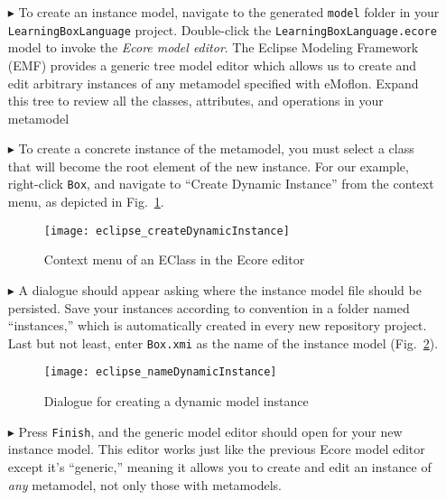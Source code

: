 \begin{itemize}

\item[$\blacktriangleright$] To create an instance model, navigate to the generated \texttt{model} folder in your \texttt{LearningBoxLanguage} project.
Double-click the \texttt{LearningBoxLa\-nguage.ecore} model to invoke  the \emph{Ecore model editor}. The Eclipse Modeling Framework (EMF) provides a generic
tree model editor which allows us to create and edit arbitrary instances of any metamodel specified with eMoflon. Expand this tree to review all the classes,
attributes, and operations in your metamodel

\vspace{0.5cm}

\item[$\blacktriangleright$] To create a concrete instance of the metamodel, you must select a class that will become the root element of the new instance.
For our example, right-click \texttt{Box}, and navigate to ``Create Dynamic Instance'' from the context menu, as depicted in Fig.~\ref{fig:context_menu}.

\begin{figure}[htbp]
	\centering
  \texttt{[image: eclipse\_createDynamicInstance]}
	\caption{Context menu of an EClass in the Ecore editor}
	\label{fig:context_menu}
\end{figure}

\vspace{0.5cm}

\item[$\blacktriangleright$] A dialogue should appear asking where the instance model file should be persisted. Save your instances according to convention in a
folder named ``instances,'' which is automatically created in every new repository project. Last but not least, enter \texttt{Box.xmi} as the name of the
instance model (Fig.~\ref{fig:store_dynamic_instance}).

\vspace{0.5cm}

\begin{figure}[htbp]
	\centering
  \texttt{[image: eclipse\_nameDynamicInstance]}
	\caption{Dialogue for creating a dynamic model instance}
	\label{fig:store_dynamic_instance}
\end{figure}

\item[$\blacktriangleright$] Press \texttt{Finish}, and the generic model editor should open for your new instance model. This editor works just like the
previous Ecore model editor except it's ``generic,'' meaning it allows you to create and edit an instance of \emph{any} metamodel, not only those with
metamodels.


\end{itemize}
